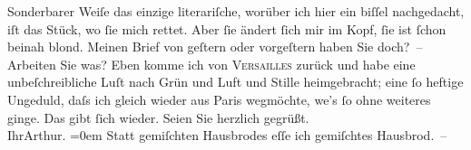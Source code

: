 \begin{ledgroupsized}[t]{13cm}
                    Sonderbarer Weiſe das einzige literariſche, worüber ich hier ein biſſel
                    nachgedacht, iſt das Stück,
                    wo  ſie mich {\pb}rettet. Aber ſie ändert ſich mir im Kopf, ſie ist ſchon beinah blond.\pend
           \pstart
           Meinen Brief von geſtern oder vorgeſtern haben Sie doch? –\pend
           \pstart
           Arbeiten Sie was?\pend
           \pstart
           Eben komme ich von \textsc{Versailles} zurück und habe eine unbeſchreibliche Luſt nach Grün und Luft und Stille
                        heimge{\pb}bracht; eine ſo heftige Ungeduld, daſs ich
                    gleich wieder aus Paris wegmöchte, we{\geminationn}’s ſo ohne
                    weiteres ginge.\pend
           \pstart
           Das gibt ſich wieder.\pend
           \pstart
           Seien Sie herzlich gegrüßt.{\\[\baselineskip]}Ihr\spacefill\mbox{Arthur.}\pend
           \leftskip=0em{}\pstart
           \noindent{}Statt gemiſchten Hausbrodes eſſe ich gemiſchtes Hausbrod. –\pend
                     \endnumbering{}\end{ledgroupsized}  \newcommand{\dateiname}{L00672}\newcommand{\titel}{Arthur Schnitzler an Hugo von Hofmannsthal, 28. 4. 1897}\newcommand{\editorInnen}{Martin Anton Müller und Gerd-Hermann Susen}
            \footnotesize
\begin{ledgroupsized}[t]{11.5cm}
\end{ledgroupsized}
         
      